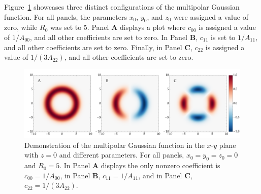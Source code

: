 Figure~\ref{fig:multipolar_gaussian_id_demo} showcases three distinct configurations of the multipolar Gaussian function. For all panels, the parameters $x_0$, $y_0$, and $z_0$ were assigned a value of zero, while $R_0$ was set to 5. Panel \textbf{A} displays a plot where $c_{00}$ is assigned a value of $1/A_{00}$, and all other coefficients are set to zero. In Panel \textbf{B}, $c_{11}$ is set to $1/A_{11}$, and all other coefficients are set to zero. Finally, in Panel \textbf{C}, $c_{22}$ is assigned a value of $1/(3A_{22})$, and all other coefficients are set to zero.

\begin{figure}[!ht]
  \centering
  \includegraphics[width=\linewidth]{img/wave_scattering/multipolar_gaussian_id_examples.png}
  \caption{Demonstration of the multipolar Gaussian function in the $x$-$y$ plane with $z=0$ and different parameters. For all panels, $x_0 = y_0 = z_0 = 0$ and $R_0 = 5$. In Panel \textbf{A} displays the only nonzero coefficient is $c_{00} = 1/A_{00}$, in Panel \textbf{B}, $c_{11} = 1/A_{11}$, and in Panel \textbf{C}, $c_{22} = 1/(3A_{22})$.}
  \label{fig:multipolar_gaussian_id_demo}
\end{figure}